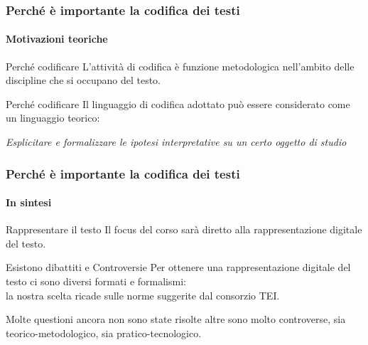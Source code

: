\begin{frame}
    \frametitle{Perché è importante la codifica dei testi}
    \framesubtitle{Motivazioni teoriche}
    \addtocounter{nframe}{1}
    
    \begin{block}{Perché codificare}
        L'attività di codifica è funzione metodologica nell'ambito delle discipline che si occupano del testo.
     \end{block}

     \begin{block}{Perché codificare}
     Il linguaggio di codifica adottato può essere considerato come un linguaggio teorico:
      
     \begin{center}
        \textit{Esplicitare e formalizzare le ipotesi interpretative su un certo oggetto di studio}
     \end{center} 
    \end{block}

\end{frame}

\begin{frame}
    \frametitle{Perché è importante la codifica dei testi}
    \framesubtitle{In sintesi}
    \addtocounter{nframe}{1}
    
    \begin{block}{Rappresentare il testo}
         Il focus del corso sarà diretto alla rappresentazione digitale del testo.
    \end{block}

    \begin{block}{Esistono dibattiti e Controversie}
        Per ottenere una rappresentazione digitale del testo ci sono diversi formati e formalismi:
        \\ la nostra scelta ricade sulle norme suggerite dal consorzio TEI.
    
        Molte questioni ancora non sono state risolte altre sono molto controverse, sia teorico-metodologico, sia pratico-tecnologico.
   
    \end{block}

\end{frame}

